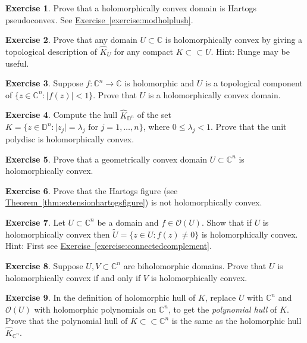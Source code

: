 \documentclass[12pt,openany]{book}
\newcommand{\sabs}[1]{\lvert {#1} \rvert}
\newcommand{\C}{{\mathbb{C}}}
\newcommand{\D}{{\mathbb{D}}}
\newcommand{\sO}{{\mathscr{O}}}
\newcommand{\myindex}[1]{#1\index{#1}}
\theoremstyle{plain}
\theoremstyle{remark}
\theoremstyle{definition}
\newenvironment{exbox}{%
    \def\FrameCommand{\vrule width 1pt \relax\hspace {10pt}}%
    \MakeFramed {\advance \hsize -\width \FrameRestore }%
}{%
    \endMakeFramed
}
\theoremstyle{exercise}
\newtheorem{exercise}{Exercise}[section]
\theoremstyle{example}
\newcommand{\exerciseref}[1]{\hyperref[#1]{Exercise~\ref*{#1}}}
\newcommand{\thmref}[1]{\hyperref[#1]{Theorem~\ref*{#1}}}
\begin{document}
\begin{exbox}
\begin{exercise}
Prove that a holomorphically convex domain is Hartogs pseudoconvex.
See \exerciseref{exercise:modholplush}.
\end{exercise}

\begin{exercise}
Prove that any domain $U \subset \C$ is holomorphically convex by 
giving a topological description of $\widehat{K}_U$ for any
compact $K \subset \subset U$.  Hint: Runge may be useful.
\end{exercise}

\begin{exercise}
Suppose $f \colon \C^n \to \C$ is holomorphic and $U$ is a topological
component of $\bigl\{ z \in \C^n : \sabs{f(z)} < 1 \bigr\}$.  Prove
that $U$ is a holomorphically convex domain.
\end{exercise}

\begin{exercise}
Compute the hull
$\widehat{K}_{\D^n}$ of the set $K = \bigl\{ z \in \D^n : \sabs{z_j} =
\lambda_j \text{ for } j=1,\ldots,n \bigr\}$, where $0 \leq \lambda_j < 1$.
Prove that the unit polydisc is holomorphically convex.
\end{exercise}

\begin{exercise}
Prove that a geometrically convex domain $U \subset \C^n$
is holomorphically convex.
\end{exercise}

\begin{exercise}
Prove that the Hartogs figure (see \thmref{thm:extensionhartogsfigure})
is not holomorphically convex.
\end{exercise}

\begin{exercise}
Let $U \subset \C^n$ be a domain and $f \in \sO(U)$.  Show that if
$U$ is holomorphically convex then
$\widetilde{U} = \bigl\{ z \in U : f(z) \not= 0 \bigr\}$
is holomorphically convex.  
Hint: First see \exerciseref{exercise:connectedcomplement}.
\end{exercise}

\begin{exercise} \label{exercise:biholholconvex}
Suppose $U,V \subset \C^n$ are biholomorphic domains.
Prove that $U$ is holomorphically convex if and only if $V$ is
holomorphically convex.
\end{exercise}

\begin{exercise}
In the definition of holomorphic hull of $K$, replace $U$ with $\C^n$
and $\sO(U)$ with holomorphic polynomials on $\C^n$, to get the
\emph{\myindex{polynomial hull}} of $K$.  Prove that the polynomial hull of
$K \subset \subset \C^n$ is the same as the holomorphic hull $\widehat{K}_{\C^n}$.
\end{exercise}


\end{exbox}
\end{document}
